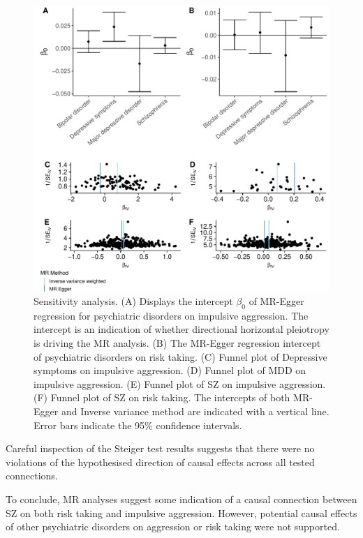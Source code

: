 \begin{figure}[htpb]
  \centering
  \includegraphics[width=0.9\linewidth]{ukb_psychiatric/figures/sensitvity_plot.pdf}
  \caption[Sensitivity Analysis]{Sensitivity analysis.
    (A) Displays the intercept $\beta_0$ of MR-Egger regression for psychiatric disorders on impulsive aggression. The intercept is an indication of whether directional horizontal pleiotropy is driving the MR analysis.
    (B) The MR-Egger regression intercept of psychiatric disorders on risk taking.
    (C) Funnel plot of Depressive symptoms on impulsive aggression. 
    (D) Funnel plot of MDD on impulsive aggression. 
    (E) Funnel plot of SZ on impulsive aggression. 
    (F) Funnel plot of SZ on risk taking. 
    The intercepts of both MR-Egger and Inverse variance method are indicated with a vertical line.
    Error bars indicate the 95\% confidence intervals.
  }\label{fig:sensitivity}
\end{figure}

Careful inspection of the Steiger test results suggests that there were no violations of the hypothesised direction of causal effects across all tested connections.

To conclude, MR analyses suggest some indication of a causal connection between SZ on both risk taking and impulsive aggression.
However, potential causal effects of other psychiatric disorders on aggression or risk taking were not supported.

